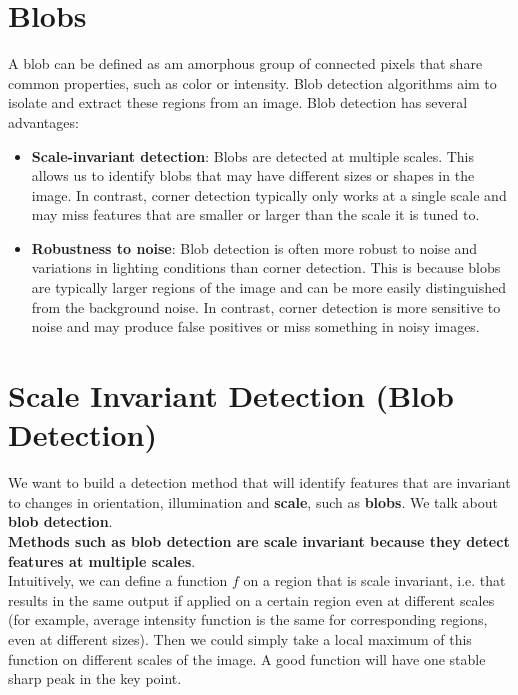 \documentclass{article}
\begin{document}
\newpage

\section*{Blobs}

A blob can be defined as am amorphous group of connected pixels that share common properties, such as color or intensity. Blob detection algorithms aim to isolate and extract these regions from an image. Blob detection has several advantages:

\begin{itemize}
    \item \textbf{Scale-invariant detection}: Blobs are detected at multiple scales. This allows us to identify blobs that may have different sizes or shapes in the image. In contrast, corner detection typically only works at a single scale and may miss features that are smaller or larger than the scale it is tuned to.
    \item \textbf{Robustness to noise}: Blob detection is often more robust to noise and variations in lighting conditions than corner detection. This is because blobs are typically larger regions of the image and can be more easily distinguished from the background noise. In contrast, corner detection is more sensitive to noise and may produce false positives or miss something in noisy images.
\end{itemize}


\section*{Scale Invariant Detection (Blob Detection)}

We want to build a detection method that will identify features that are invariant to changes in orientation, illumination and \textbf{scale}, such as \textbf{blobs}. We talk about \textbf{blob detection}. \\ 

\textbf{Methods such as blob detection are scale invariant because they detect features at multiple scales}.\\

Intuitively, we can define a function $f$ on a region that is scale invariant, i.e. that results in the same output if applied on a certain region even at different scales (for example, average intensity function is the same for corresponding regions, even at different sizes). Then we could simply take a local maximum of this function on different scales of the image. A good function will have one stable sharp peak in the key point. \\
\end{document}
